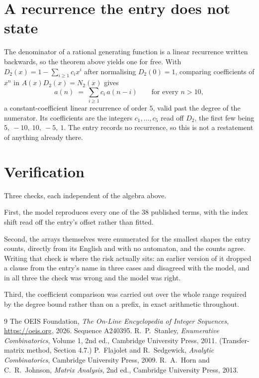 \documentclass[11pt,a4paper]{article}
\theoremstyle{plain}
\theoremstyle{definition}
\begin{document}
\section{A recurrence the entry does not state}

The denominator of a rational generating function is a linear recurrence written backwards, so
the theorem above yields one for free. With $D_2(x)=1-\sum_{i\ge1}c_ix^i$ after normalising
$D_2(0)=1$, comparing coefficients of $x^n$ in $A(x)D_2(x)=N_2(x)$ gives
\[
a(n)\;=\;\sum_{i\ge1}c_i\,a(n-i)\qquad\text{for every }n>10,
\]
a constant-coefficient linear recurrence of order $5$, valid past the degree of the
numerator. Its coefficients are the integers $c_1,\dots,c_{5}$ read off $D_2$, the first few being $5,\ -10,\ 10,\ -5,\ 1$. The entry records no recurrence, so this is not a restatement of anything
already there.

\section{Verification}

Three checks, each independent of the algebra above.

First, the model reproduces every one of the $38$ published terms, with the index shift
read off the entry's offset rather than fitted.

Second, the arrays themselves were enumerated for the smallest shapes the entry counts,
directly from its English and with no automaton, and the counts agree. Writing that check is
where the risk actually sits: an earlier version of it dropped a clause from the entry's name
in three cases and disagreed with the model, and in all three the check was wrong and the model
was right.

Third, the coefficient comparison was carried out over the whole range required by the degree
bound rather than on a prefix, in exact arithmetic throughout.

\begin{thebibliography}{9}
 The OEIS Foundation, \emph{The On-Line Encyclopedia of Integer
Sequences}, \url{https://oeis.org}, 2026. Sequence A240395.
 R.~P.~Stanley, \emph{Enumerative Combinatorics}, Volume 1, 2nd ed.,
Cambridge University Press, 2011. (Transfer-matrix method, Section 4.7.)
 P.~Flajolet and R.~Sedgewick, \emph{Analytic Combinatorics}, Cambridge
University Press, 2009.
 R.~A.~Horn and C.~R.~Johnson, \emph{Matrix Analysis}, 2nd ed., Cambridge
University Press, 2013.
\end{thebibliography}
\end{document}
